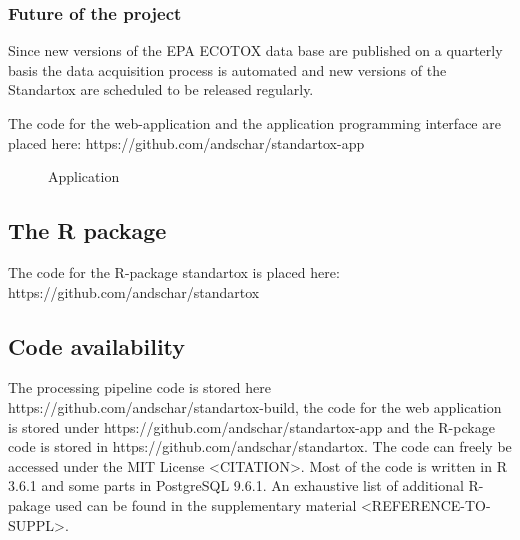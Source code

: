 \subsubsection*{Future of the project}
Since new versions of the EPA ECOTOX data base are published on a quarterly basis the data acquisition process is automated and new versions of the Standartox are scheduled to be released regularly.


The code for the web-application and the application programming interface are placed here: https://github.com/andschar/standartox-app

\begin{figure}
    
    \caption{Application}
    \label{fig:app}
\end{figure}

\subsection*{The R package}

The code for the R-package standartox is placed here: https://github.com/andschar/standartox




\subsection*{Code availability}

The processing pipeline code is stored here https://github.com/andschar/standartox-build, the code for the web application is stored under https://github.com/andschar/standartox-app and the R-pckage code is stored in https://github.com/andschar/standartox. The code can freely be accessed under the MIT License <CITATION>. Most of the code is written in R 3.6.1 and some parts in PostgreSQL 9.6.1. An exhaustive list of additional R-pakage used can be found in the supplementary material <REFERENCE-TO-SUPPL>.

